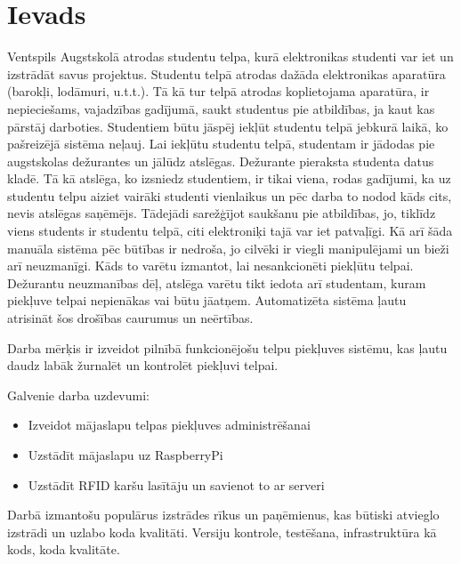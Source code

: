 \chapter*{Ievads}


Ventspils Augstskolā atrodas studentu telpa, kurā elektronikas studenti var iet un izstrādāt savus projektus. Studentu telpā atrodas dažāda elektronikas aparatūra (barokļi, lodāmuri, u.t.t.). Tā kā tur telpā atrodas koplietojama aparatūra, ir nepieciešams, vajadzības gadījumā, saukt studentus pie atbildības, ja kaut kas pārstāj darboties.
Studentiem būtu jāspēj iekļūt studentu telpā jebkurā laikā, ko pašreizējā sistēma neļauj.
Lai iekļūtu studentu telpā, studentam ir jādodas pie augstskolas dežurantes un jālūdz atslēgas. Dežurante pieraksta studenta datus kladē. Tā kā atslēga, ko izsniedz studentiem, ir tikai viena, rodas gadījumi, ka uz studentu telpu aiziet vairāki studenti vienlaikus un pēc darba to nodod kāds cits, nevis atslēgas saņēmējs. Tādejādi sarežģījot saukšanu pie atbildības, jo, tiklīdz viens students ir studentu telpā, citi elektroniķi tajā var iet patvaļīgi.
Kā arī šāda manuāla sistēma pēc būtības ir nedroša, jo cilvēki ir viegli manipulējami un bieži arī neuzmanīgi. Kāds to varētu izmantot, lai nesankcionēti piekļūtu telpai. Dežurantu neuzmanības dēļ, atslēga varētu tikt iedota arī studentam, kuram piekļuve telpai nepienākas vai būtu jāatņem.
Automatizēta sistēma ļautu atrisināt šos drošības caurumus un neērtības.


Darba mērķis ir izveidot pilnībā funkcionējošu telpu piekļuves sistēmu, kas ļautu daudz labāk žurnalēt un kontrolēt piekļuvi telpai.

Galvenie darba uzdevumi:
\begin{itemize}
  \item Izveidot mājaslapu telpas piekļuves administrēšanai
  \item Uzstādīt mājaslapu uz RaspberryPi
  \item Uzstādīt RFID karšu lasītāju un savienot to ar serveri
\end{itemize}

Darbā izmantošu populārus izstrādes rīkus un paņēmienus, kas būtiski atvieglo izstrādi un uzlabo koda kvalitāti.
Versiju kontrole, testēšana, infrastruktūra kā kods, koda kvalitāte.
